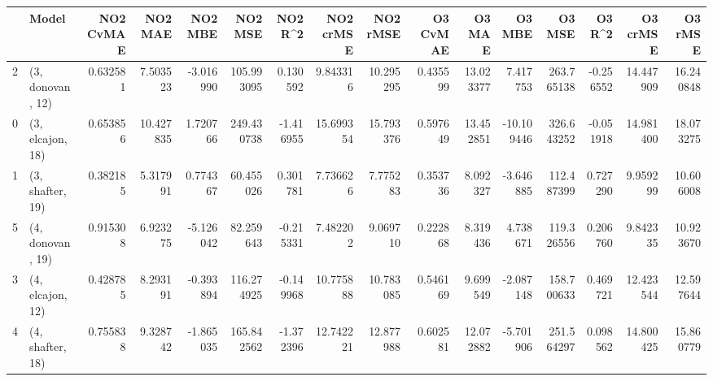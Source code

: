 \begin{tabular}{llrrrrrrrrrrrrrr}
\toprule
{} &             Model &  NO2 CvMAE &    NO2 MAE &   NO2 MBE &     NO2 MSE &   NO2 R\textasciicircum2 &  NO2 crMSE &   NO2 rMSE &  O3 CvMAE &     O3 MAE &     O3 MBE &      O3 MSE &    O3 R\textasciicircum2 &   O3 crMSE &    O3 rMSE \\
\midrule
2 &  (3, donovan, 12) &   0.632581 &   7.503523 & -3.016990 &  105.993095 &  0.130592 &   9.843316 &  10.295295 &  0.435599 &  13.023377 &   7.417753 &  263.765138 & -0.256552 &  14.447909 &  16.240848 \\
0 &  (3, elcajon, 18) &   0.653856 &  10.427835 &  1.720766 &  249.430738 & -1.416955 &  15.699354 &  15.793376 &  0.597649 &  13.452851 & -10.109446 &  326.643252 & -0.051918 &  14.981400 &  18.073275 \\
1 &  (3, shafter, 19) &   0.382185 &   5.317991 &  0.774367 &   60.455026 &  0.301781 &   7.736626 &   7.775283 &  0.353736 &   8.092327 &  -3.646885 &  112.487399 &  0.727290 &   9.959299 &  10.606008 \\
5 &  (4, donovan, 19) &   0.915308 &   6.923275 & -5.126042 &   82.259643 & -0.215331 &   7.482202 &   9.069710 &  0.222868 &   8.319436 &   4.738671 &  119.326556 &  0.206760 &   9.842335 &  10.923670 \\
3 &  (4, elcajon, 12) &   0.428785 &   8.293191 & -0.393894 &  116.274925 & -0.149968 &  10.775888 &  10.783085 &  0.546169 &   9.699549 &  -2.087148 &  158.700633 &  0.469721 &  12.423544 &  12.597644 \\
4 &  (4, shafter, 18) &   0.755838 &   9.328742 & -1.865035 &  165.842562 & -1.372396 &  12.742221 &  12.877988 &  0.602581 &  12.072882 &  -5.701906 &  251.564297 &  0.098562 &  14.800425 &  15.860779 \\
\bottomrule
\end{tabular}
